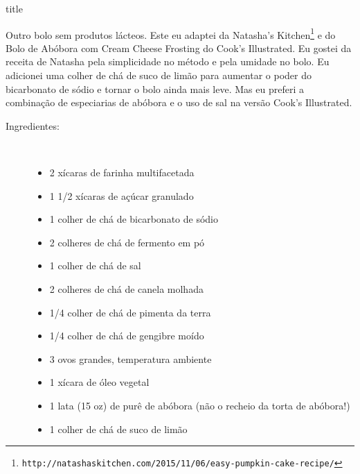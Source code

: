 \documentclass [11pt, letterpaper] {article}
\begin{document}
 {title}

Outro bolo sem produtos lácteos. Este eu adaptei da Natasha's Kitchen\footnote{{\tt http://natashaskitchen.com/2015/11/06/easy-pumpkin-cake-recipe/}} e do Bolo de Ab\'obora com Cream Cheese Frosting do Cook's Illustrated. Eu gostei da receita de Natasha pela simplicidade no método e pela umidade no bolo. Eu adicionei uma colher de chá de suco de limão para aumentar o poder do bicarbonato de sódio e tornar o bolo ainda mais leve. Mas eu preferi a combinação de especiarias de abóbora e o uso de sal na versão Cook's Illustrated.

 
\begin {description}

\item [Ingredientes:] \ \\
\begin {itemize}
\item 2 xícaras de farinha multifacetada
\item 1 1/2 xícaras de açúcar granulado
\item 1 colher de chá de bicarbonato de sódio
\item 2 colheres de chá de fermento em pó
\item 1 colher de chá de sal
\item 2 colheres de chá de canela molhada
\item 1/4 colher de chá de pimenta da terra
\item 1/4 colher de chá de gengibre moído
\item 3 ovos grandes, temperatura ambiente
\item 1 xícara de óleo vegetal
\item 1 lata (15 oz) de purê de abóbora (não o recheio da torta de abóbora!)
\item 1 colher de chá de suco de limão
\end {itemize}


\end{description}
\end{document}
